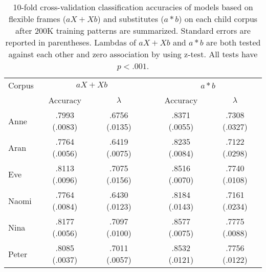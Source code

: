 \begin{table}[ht]
  \small
  \centering
  \caption{10-fold cross-validation classification accuracies of models based
    on flexible frames ($aX + Xb$) and substitutes ($a*b$) on each child corpus
    after 200K training patterns are summarized.  Standard errors are reported
    in parentheses.  Lambdas of $aX+Xb$ and $a*b$ are both tested against each
    other and zero association by using z-test.  All tests have $p<.001$.}
  \begin{tabular}{lccccc}
    \hline
    Corpus & \multicolumn{2}{c}{$aX+Xb$} && \multicolumn{2}{c}{$a*b$} \\
    \cline{2-3}
    \cline{5-6}
    & Accuracy & $\lambda$ && Accuracy & $\lambda$\\
  \hline
    Anne  & .7993 (.0083) & .6756 (.0135) && .8371 (.0055) & .7308 (.0327)\\
    Aran  & .7764 (.0056) & .6419 (.0075) && .8235 (.0084) & .7122 (.0298)\\ 
    Eve   & .8113 (.0096) & .7075 (.0156) && .8516 (.0070) & .7740 (.0108)\\
    Naomi & .7764 (.0084) & .6430 (.0123) && .8184 (.0143) & .7161 (.0234)\\
    Nina  & .8177 (.0056) & .7097 (.0100) && .8577 (.0075) & .7775 (.0088)\\
    Peter & .8085 (.0037) & .7011 (.0057) && .8532 (.0121) & .7756 (.0122)\\
    \hline
  \end{tabular}
  \label{t:framevssub100K}
\end{table}
